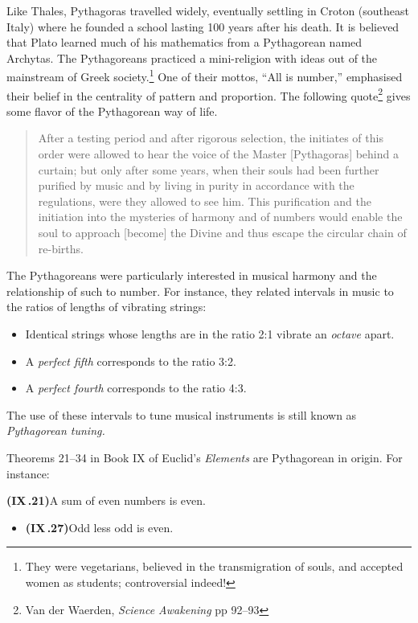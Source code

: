 Like Thales, Pythagoras travelled widely, eventually settling in Croton (southeast Italy) where he founded a school lasting 100 years after his death. It is believed that Plato learned much of his mathematics from a Pythagorean named Archytas.\smallbreak
The Pythagoreans practiced a mini-religion with ideas out of the mainstream of Greek society.\footnote{They were vegetarians, believed in the transmigration of souls, and accepted women as students; controversial indeed!} One of their mottos, ``All is number,'' emphasised their belief in the centrality of pattern and proportion. The following quote\footnote{Van der Waerden, \emph{Science Awakening} pp 92--93} gives some flavor of the Pythagorean way of life.
\begin{quote}
  After a testing period and after rigorous selection, the initiates of this order were allowed to hear the voice of the Master [Pythagoras] behind a curtain; but only after some years, when their souls had been further purified by music and by living in purity in accordance with the regulations, were they allowed to see him. This purification and the initiation into the mysteries of harmony and of numbers would enable the soul to approach [become] the Divine and thus escape the circular chain of re-births.
\end{quote}

The Pythagoreans were particularly interested in musical harmony and the relationship of such to number. For instance, they related intervals in music to the ratios of lengths of vibrating strings:\vspace{-3pt}
\begin{itemize}\itemsep0pt\label{pg:pythagtuning}
  \item Identical strings whose lengths are in the ratio 2:1 vibrate an \emph{octave} apart.
  \item A \emph{perfect fifth} corresponds to the ratio 3:2.
  \item A \emph{perfect fourth} corresponds to the ratio 4:3.
\end{itemize}\vspace{-3pt}
The use of these intervals to tune musical instruments is still known as \emph{Pythagorean tuning.}
\goodbreak

Theorems 21--34 in Book IX of Euclid's \emph{Elements} are Pythagorean in origin. For instance:

\begin{thm*}{}{}
  {\normalfont\textbf{(IX\,.21)}}\lstsp A sum of even numbers is even.\par\vspace{-8pt}
  \begin{itemize}
    \item[]{\normalfont\textbf{(IX\,.27)}}\lstsp Odd less odd is even.
  \end{itemize}
\end{thm*}

